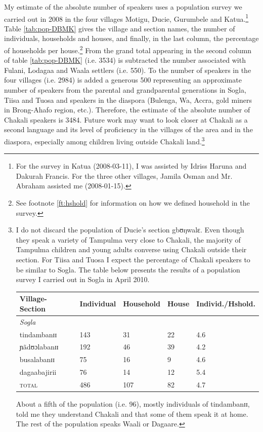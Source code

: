 My estimate of the absolute number of speakers  uses a population survey we
carried out in
2008 in the four villages Motigu, Ducie, Gurumbele and Katua.\footnote{For the
survey in Katua (2008-03-11),  I was  assisted by Idriss Haruna and Dakurah
Francis. For the three other villages, Jamila Osman and Mr. Abraham assisted
me (2008-01-15).} Table \ref{tab:pop-DBMK} gives the village and section names,
the number of individuals, households and  houses, and finally, in the last
column,  the percentage of households per house.\footnote{See footnote
\ref{ft:hshold} for  information on how we defined household in the survey.}
From the grand total appearing in the second column of table
\ref{tab:pop-DBMK} (i.e. 3534)
is subtracted the number associated with Fulani, Lodagaa and Waala settlers
(i.e. 550). To the number of speakers in the four villages (i.e. 2984) is
added a generous 500 representing an approximate number of speakers from the
parental and 
grandparental generations in Sogla, Tiisa and Tuosa and speakers in the
diaspora
(Bulenga, Wa, Accra, gold miners in Brong-Ahafo region,
etc.). Therefore,  the estimate of the absolute
number of
Chakali  speakers is 3484. Future work  may want to look closer at
Chakali as a second language and its level of proficiency in the villages of
the area and in
the diaspora, especially among children living outside Chakali land.\footnote{I
do not discard the population of Ducie's section
{\F gbʊŋwalɛ}. Even though they speak a variety of Tampulma very close to
Chakali, the
majority of  Tampulma children and young adults converse using Chakali outside
their section. For Tiisa and Tuosa I expect  the percentage of Chakali speakers
to be similar to Sogla. The table below presents the results of a population
survey I carried out in Sogla in April 2010. 

\begin{center}

\begin{tabular}{lllll}
\hline
Village-Section & Individual & Household & House & Individ./Hshold.\\[1ex]
\hline
\multicolumn{4}{l}{\it Sogla}\\[1ex] \hline

 tindambanɪɪ      &	143&	31&	 22&4.6 \\
     ɲãdʊɔlabanɪɪ    &	192&	46&	39 &4.2 \\
      busalabanɪɪ &	75&	16&	9 & 4.6\\
     dagaabajirii   &76	&14	&	12 &5.4 \\
\hline

\textsc{total} &486 &107&  82& 4.7 \\[1ex]\hline
\end{tabular}
\end{center}


 About a fifth of the
population (i.e. 96), mostly individuals of {\F tindambanɪɪ}, told
me  they understand Chakali and that some of them speak it at home. The rest of
the
population speaks Waali or Dagaare.}  



